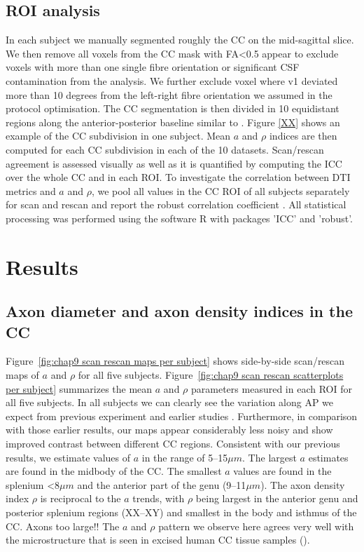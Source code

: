 \subsection*{ROI analysis} In each subject we manually segmented roughly the CC on the mid-sagittal slice. We then remove all voxels from the CC mask with FA<0.5 appear to exclude voxels with more than one single fibre orientation or significant CSF contamination from the analysis. We further exclude voxel where v1 deviated more than 10 degrees from the left-right fibre orientation we assumed in the protocol optimisation. The CC segmentation is then divided in 10 equidistant regions along the anterior-posterior baseline similar to \cite{Aboitiz}. Figure \ref{XX} shows an example of the CC subdivision in one subject. Mean $a$ and $\rho$ indices are then computed for each CC subdivision in each of the 10 datasets. Scan/rescan agreement is assessed visually as well as it is quantified by computing the \gls{ICC} \citep{Shrout:1979} over the whole CC and in each \gls{ROI}. To investigate the correlation between DTI metrics and $a$ and $\rho$, we pool all values in the CC ROI of all subjects separately for scan and rescan and report the robust correlation coefficient \citep{XX}. All statistical processing was performed using the software R\citep{RCoreTeam:2012} with packages 'ICC'\citep{Wolak:2011} and 'robust'\citep{Wang:2012}.
\FloatBarrier
\section{Results}
\subsection*{Axon diameter and axon density indices in the CC}
Figure~\ref{fig:chap9 scan rescan maps per subject} shows side-by-side scan/rescan maps of $a$ and $\rho$ for all five subjects. Figure~\ref{fig:chap9 scan rescan scatterplots per subject} summarizes the mean $a$ and $\rho$ parameters measured in each ROI for all five subjects. In all subjects we can clearly see the variation along AP we expect from previous experiment and earlier studies \citep{Alexander:2010}. Furthermore, in comparison with those earlier results, our maps appear considerably less noisy and show improved contrast between different CC regions. Consistent with our previous results, we estimate values of $a$ in the range of 5--15$\mu m$. The largest $a$ estimates are found in the midbody of the CC. The smallest $a$ values are found in the splenium <8$\mu m$ and the anterior part of the genu (9--11$\mu m$). The axon density index $\rho$ is reciprocal to the $a$ trends, with $\rho$ being largest in the anterior genu and posterior splenium regions  (XX--XY) and smallest in the body and isthmus of the CC. Axons too large!! The $a$ and $\rho$ pattern we observe here agrees very well with the microstructure that is seen in excised human CC tissue samples ().


